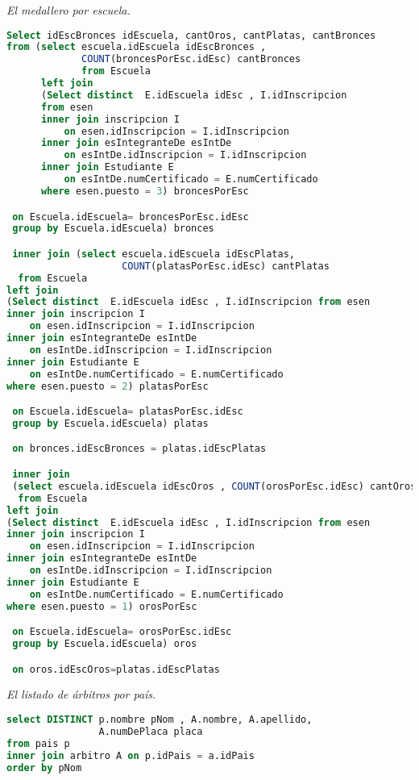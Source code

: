 \emph{El medallero por escuela.}
\begin{lstlisting}[language=SQL]
Select idEscBronces idEscuela, cantOros, cantPlatas, cantBronces
from (select escuela.idEscuela idEscBronces ,
             COUNT(broncesPorEsc.idEsc) cantBronces
             from Escuela
      left join
      (Select distinct  E.idEscuela idEsc , I.idInscripcion
      from esen
      inner join inscripcion I
          on esen.idInscripcion = I.idInscripcion
      inner join esIntegranteDe esIntDe
          on esIntDe.idInscripcion = I.idInscripcion
      inner join Estudiante E
          on esIntDe.numCertificado = E.numCertificado
      where esen.puesto = 3) broncesPorEsc

 on Escuela.idEscuela= broncesPorEsc.idEsc
 group by Escuela.idEscuela) bronces

 inner join (select escuela.idEscuela idEscPlatas,
                    COUNT(platasPorEsc.idEsc) cantPlatas
  from Escuela
left join
(Select distinct  E.idEscuela idEsc , I.idInscripcion from esen
inner join inscripcion I
    on esen.idInscripcion = I.idInscripcion
inner join esIntegranteDe esIntDe
    on esIntDe.idInscripcion = I.idInscripcion
inner join Estudiante E
    on esIntDe.numCertificado = E.numCertificado
where esen.puesto = 2) platasPorEsc

 on Escuela.idEscuela= platasPorEsc.idEsc
 group by Escuela.idEscuela) platas

 on bronces.idEscBronces = platas.idEscPlatas

 inner join
 (select escuela.idEscuela idEscOros , COUNT(orosPorEsc.idEsc) cantOros
  from Escuela
left join
(Select distinct  E.idEscuela idEsc , I.idInscripcion from esen
inner join inscripcion I
    on esen.idInscripcion = I.idInscripcion
inner join esIntegranteDe esIntDe
    on esIntDe.idInscripcion = I.idInscripcion
inner join Estudiante E
    on esIntDe.numCertificado = E.numCertificado
where esen.puesto = 1) orosPorEsc

 on Escuela.idEscuela= orosPorEsc.idEsc
 group by Escuela.idEscuela) oros

 on oros.idEscOros=platas.idEscPlatas
\end{lstlisting}


\emph{El listado de árbitros por país.}
\begin{lstlisting}[language=SQL]
select DISTINCT p.nombre pNom , A.nombre, A.apellido,
                A.numDePlaca placa
from pais p
inner join arbitro A on p.idPais = a.idPais
order by pNom
\end{lstlisting}


